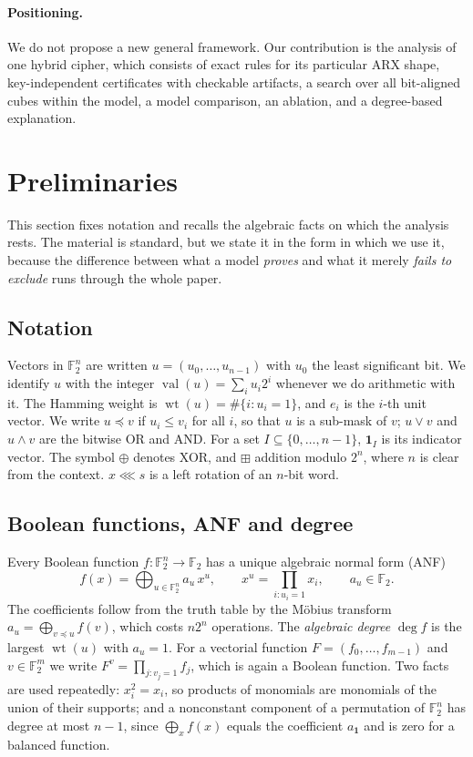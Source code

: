 \documentclass[pdflatex,sn-mathphys-num]{sn-jnl}
\theoremstyle{thmstyleone}
\theoremstyle{thmstylethree}
\theoremstyle{thmstyletwo}
\newcommand{\modadd}{\boxplus}
\newcommand{\Ftwo}{\mathbb{F}_2}
\newcommand{\intval}{\operatorname{val}}
\newcommand{\hw}{\operatorname{wt}}
\begin{document}
\paragraph{Positioning.} We do not propose a new general framework. Our contribution is the analysis of one hybrid cipher, which consists of exact rules for its particular ARX shape, key-independent certificates with checkable artifacts, a search over all bit-aligned cubes within the model, a model comparison, an ablation, and a degree-based explanation.

\section{Preliminaries}\label{sec:prelim}

This section fixes notation and recalls the algebraic facts on which the analysis rests. The material is standard, but we state it in the form in which we use it, because the difference between what a model \emph{proves} and what it merely \emph{fails to exclude} runs through the whole paper.

\subsection{Notation}
Vectors in $\Ftwo^n$ are written $u=(u_0,\dots,u_{n-1})$ with $u_0$ the least significant bit. We identify $u$ with the integer $\intval(u)=\sum_i u_i2^i$ whenever we do arithmetic with it. The Hamming weight is $\hw(u)=\#\{i:u_i=1\}$, and $e_i$ is the $i$-th unit vector. We write $u\preceq v$ if $u_i\le v_i$ for all $i$, so that $u$ is a sub-mask of $v$; $u\vee v$ and $u\wedge v$ are the bitwise OR and AND. For a set $I\subseteq\{0,\dots,n-1\}$, $\mathbf 1_I$ is its indicator vector. The symbol $\oplus$ denotes XOR, and $\modadd$ addition modulo $2^n$, where $n$ is clear from the context. $x\lll s$ is a left rotation of an $n$-bit word.

\subsection{Boolean functions, ANF and degree}
Every Boolean function $f:\Ftwo^n\to\Ftwo$ has a unique algebraic normal form (ANF)
\[
f(x)=\bigoplus_{u\in\Ftwo^n} a_u\,x^u,\qquad x^u=\prod_{i:u_i=1}x_i,\qquad a_u\in\Ftwo .
\]
The coefficients follow from the truth table by the Möbius transform $a_u=\bigoplus_{v\preceq u}f(v)$, which costs $n2^n$ operations. The \emph{algebraic degree} $\deg f$ is the largest $\hw(u)$ with $a_u=1$. For a vectorial function $F=(f_0,\dots,f_{m-1})$ and $v\in\Ftwo^m$ we write $F^v=\prod_{j:v_j=1}f_j$, which is again a Boolean function. Two facts are used repeatedly: $x_i^2=x_i$, so products of monomials are monomials of the union of their supports; and a nonconstant component of a permutation of $\Ftwo^n$ has degree at most $n-1$, since $\bigoplus_x f(x)$ equals the coefficient $a_{\mathbf 1}$ and is zero for a balanced function.
\end{document}

